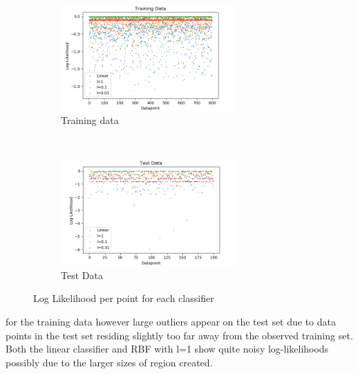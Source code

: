\documentclass[twoside,twocolumn]{article}
\begin{document}
\begin{figure}[t!]
    \centering
    \begin{subfigure}[t]{0.5\textwidth}
        \centering
        \includegraphics[height=1.58in]{traindatall3}
        \caption{Training data}
    \end{subfigure}%
    ~ 
    \begin{subfigure}[t]{0.5\textwidth}
        \centering
        \includegraphics[height=1.58in]{testdatall3}
        \caption{Test Data}
    \end{subfigure}
    \caption{Log Likelihood per point for each classifier}
    \label{fig:llt}
\end{figure}
 
  for the training data however large outliers appear on the test set due to data points in the test set residing slightly too far away from the observed training set. Both the linear classifier and RBF with l=1 show quite noisy log-likelihoods   possibly due to the larger sizes of region created.
\end{document}
